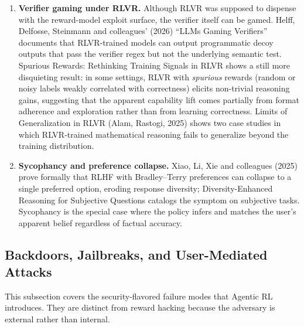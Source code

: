 \documentclass{article}
\begin{document}
\begin{enumerate}
\def\labelenumi{(\roman{enumi})}
\setcounter{enumi}{1}
\item
  \textbf{Verifier gaming under RLVR.} Although RLVR was supposed to dispense with the reward-model exploit surface, the verifier itself can be gamed. Helff, Delfosse, Steinmann and colleagues' (2026) ``LLMs Gaming Verifiers'' documents that RLVR-trained models can output programmatic decoy outputs that pass the verifier regex but not the underlying semantic test. Spurious Rewards: Rethinking Training Signals in RLVR \citep{shao20252025} shows a still more disquieting result: in some settings, RLVR with \emph{spurious} rewards (random or noisy labels weakly correlated with correctness) elicits non-trivial reasoning gains, suggesting that the apparent capability lift comes partially from format adherence and exploration rather than from learning correctness. Limits of Generalization in RLVR (Alam, Rastogi, 2025) shows two case studies in which RLVR-trained mathematical reasoning fails to generalize beyond the training distribution.
\item
  \textbf{Sycophancy and preference collapse.} Xiao, Li, Xie and colleagues (2025) prove formally that RLHF with Bradley--Terry preferences can collapse to a single preferred option, eroding response diversity; Diversity-Enhanced Reasoning for Subjective Questions \citep{wang20252025} catalogs the symptom on subjective tasks. Sycophancy is the special case where the policy infers and matches the user's apparent belief regardless of factual accuracy.
\end{enumerate}

\subsection{Backdoors, Jailbreaks, and User-Mediated Attacks}\label{backdoors-jailbreaks-and-user-mediated-attacks}

This subsection covers the security-flavored failure modes that Agentic RL introduces. They are distinct from reward hacking because the adversary is external rather than internal.
\end{document}
